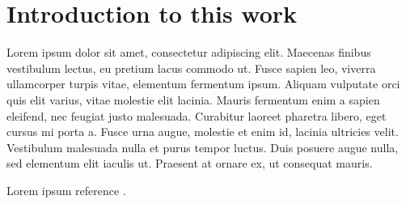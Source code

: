 \chapter{Introduction to this work}


Lorem ipsum dolor sit amet, consectetur adipiscing elit. Maecenas finibus
vestibulum lectus, eu pretium lacus commodo ut. Fusce sapien leo, viverra
ullamcorper turpis vitae, elementum fermentum ipsum. Aliquam vulputate orci quis
elit varius, vitae molestie elit lacinia. Mauris fermentum enim a sapien
eleifend, nec feugiat justo malesuada. Curabitur laoreet pharetra libero, eget
cursus mi porta a. Fusce urna augue, molestie et enim id, lacinia ultricies
velit. Vestibulum malesuada nulla et purus tempor luctus. Duis posuere augue
nulla, sed elementum elit iaculis ut. Praesent at ornare ex, ut consequat
mauris.

Lorem ipsum reference \cite{loremipsum2021}.
